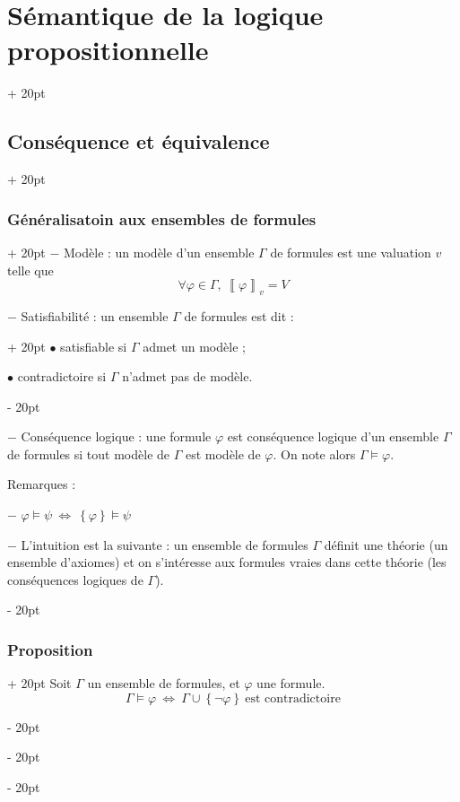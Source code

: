 \documentclass[a4paper, 12pt, twoside]{article}
\newcommand{\lrbb}[1]{\left\llbracket #1 \right\rrbracket}
\newcommand{\set}[1]{\left\{ #1 \right\}}
\newcommand{\ssi}{\ \Leftrightarrow \ }
\newcommand{\ind}[1][20pt]{\advance\leftskip + #1}
\newcommand{\deind}[1][20pt]{\advance\leftskip - #1}
\newenvironment{indt}[2][20pt]{#2 \par \ind[#1]}{\par \deind} %
\begin{document}
\begin{indt}{\section{Sémantique de la logique propositionnelle}}
\begin{indt}{\subsection{Conséquence et équivalence}}
            \vspace{12pt}
            
            \begin{indt}{\subsubsection{Généralisatoin aux ensembles de formules}}
                $-$ Modèle : un modèle d'un ensemble $\Gamma$ de formules est une valuation $v$ telle que
                    \[ \forall \varphi \in \Gamma,\ \lrbb{\varphi}_v = V \]
                
                \begin{indt}{$-$ Satisfiabilité : un ensemble $\Gamma$ de formules est dit :}
                    $\bullet$ satisfiable si $\Gamma$ admet un modèle ;
                    
                    $\bullet$ contradictoire si $\Gamma$ n'admet pas de modèle.
                \end{indt}
                
                \vspace{12pt}
                
                $-$ Conséquence logique : une formule $\varphi$ est conséquence logique d'un ensemble $\Gamma$ de formules si tout modèle de $\Gamma$ est modèle de $\varphi$. On note alors $\Gamma \vDash \varphi$.
                
                \vspace{12pt}
                
                Remarques :
                
                $-$ $\varphi \vDash \psi \ssi \set \varphi \vDash \psi$
                
                $-$ L'intuition est la suivante : un ensemble de formules $\Gamma$ définit une théorie (un ensemble d'axiomes) et on s'intéresse aux formules vraies dans cette théorie (les conséquences logiques de $\Gamma$).
            \end{indt}
            
            \vspace{12pt}
            
            \begin{indt}{\subsubsection{Proposition}}
                Soit $\Gamma$ un ensemble de formules, et $\varphi$ une formule.
                    \[ \Gamma \vDash \varphi \ssi \Gamma \cup \set{\neg \varphi}\ \text{est contradictoire} \]
                

\end{indt}
\end{indt}
\end{indt}
\end{document}

